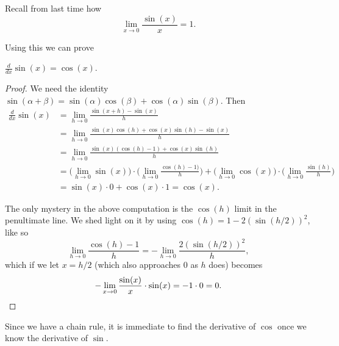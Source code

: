 

Recall from last time how
\[
	\lim_{x \to 0} \frac{\sin(x)}{x} = 1.
\]

\noindent
Using this we can prove

\begin{proposition}
	$\displaystyle \frac{d}{d x} \sin(x) = \cos(x)$.
\end{proposition}

\begin{proof}
	We need the identity $\sin(\alpha + \beta) = \sin(\alpha) \cos(\beta) + \cos(\alpha) \sin(\beta)$.
	Then
	\begin{align*}
		\frac{d}{d x} \sin(x) & = \lim_{h \to 0} \frac{\sin(x + h) - \sin(x)}{h}                                                                                                                                             \\
		                      & = \lim_{h \to 0} \frac{\sin(x) \cos(h) + \cos(x) \sin(h) - \sin(x)}{h}                                                                                                                       \\
		                      & = \lim_{h \to 0} \frac{\sin(x) (\cos(h) - 1) + \cos(x) \sin(h)}{h}                                                                                                                           \\
		                      & = \Big ( \lim_{h \to 0} \sin(x) \Big ) \cdot \Big ( \lim_{h \to 0} \frac{\cos(h) - 1)}{h} \Big ) + \Big ( \lim_{h \to 0} \cos(x) \Big ) \cdot \Big ( \lim_{h \to 0} \frac{\sin(h)}{h} \Big ) \\
		                      & = \sin(x) \cdot 0 + \cos(x) \cdot 1 = \cos(x).
	\end{align*}

	\noindent
	The only mystery in the above computation is the $\cos(h)$ limit in the penultimate line.
	We shed light on it by using $\cos(h) = 1 - 2 (\sin(h / 2))^2$, like so
	\[
		\lim_{h \to 0} \frac{\cos(h) - 1}{h} = - \lim_{h \to 0} \frac{2 (\sin(h / 2))^2}{h},
	\]
	which if we let $x = h / 2$ (which also approaches $0$ as $h$ does) becomes
	\[
		- \lim_{x \to 0} \frac{\sin(x)}{x} \cdot \sin(x) = -1 \cdot 0 = 0. \qedhere
	\]
\end{proof}

\noindent
Since we have a chain rule, it is immediate to find the derivative of $\cos$ once we know the derivative of $\sin$.


